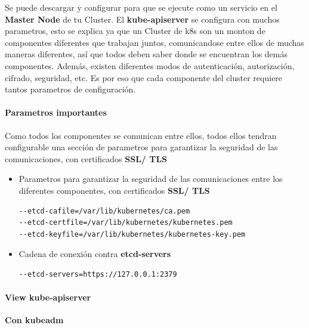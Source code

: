 \documentclass{article}
\newenvironment{blocktemplate}[1]{%
    \tcolorbox[beamer,%
    noparskip,breakable,
    colframe=Blue,%
    colbacklower=LimeGreen!75!LightGreen,%
    title=#1]}%
    {\endtcolorbox}
\newenvironment{codetemplate}[1][]{%
  \mybasecolorbox[#1]
  \itshape
}{%
  \endmybasecolorbox
}
\begin{document}
Se puede descargar y configurar para que se ejecute como un servicio en el \textbf{Master Node} de tu Cluster. El \textbf{kube-apiserver} se configura con muchos parametros, esto se explica ya que un Cluster de k8s son un monton de componentes diferentes que trabajan juntos, comunicandose entre ellos de muchas maneras diferentes, así que todos deben saber donde se encuentran los demás componentes. Además, existen diferentes modos de autenticación, autorización, cifrado, seguridad, etc. Es por eso que cada componente del cluster requiere tantos parametros de configuración.

\paragraph{Parametros importantes}

\begin{blocktemplate}{Note}
\label{SSLCerts}
Como todos los componentes se comunican entre ellos, todos ellos tendran configurable una sección de parametros para garantizar la seguridad de las comunicaciones, con certificados \textbf{SSL/ TLS}
\end{blocktemplate}

\begin{itemize}
    \item Parametros para garantizar la seguridad de las comunicaciones entre los diferentes componentes, con certificados \textbf{SSL/ TLS}
\begin{codetemplate}{}
\begin{verbatim}
--etcd-cafile=/var/lib/kubernetes/ca.pem
--etcd-certfile=/var/lib/kubernetes/kubernetes.pem
--etcd-keyfile=/var/lib/kubernetes/kubernetes-key.pem
\end{verbatim}
\end{codetemplate}

    \item Cadena de conexión contra \textbf{etcd-servers}
\begin{codetemplate}{}
\begin{verbatim}
--etcd-servers=https://127.0.0.1:2379
\end{verbatim}
\end{codetemplate}
\end{itemize}

\paragraph{View kube-apiserver}

\textbf{Con kubeadm}
\end{document}

